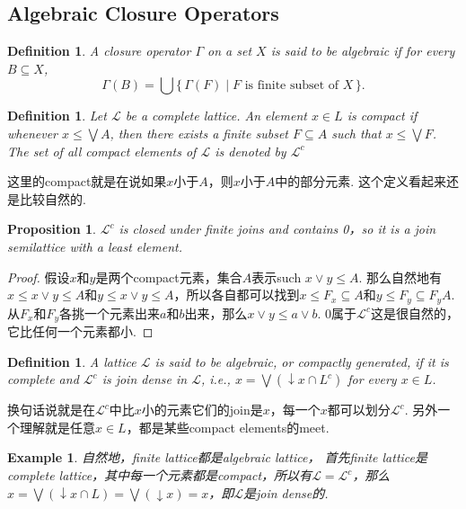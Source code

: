\documentclass{article}
\newtheorem{proposition}[theorem]{Proposition}
\newtheorem{example}[theorem]{Example}
\newtheorem{definition}[theorem]{Definition}
\newcommand\Set[2]{\{\,#1\mid#2\,\}} %
\newcommand\SET[2]{\Set{#1}{\text{#2}}} %
\newcommand\lattice{\mathcal{L}}
\begin{document}
\subsection{Algebraic Closure Operators}

\begin{definition}
\rm A {\color{red} closure operator} $\Gamma$ on a set $X$ is said to be {\color{red} algebraic} if for every $B \subseteq X$,
$$
\Gamma(B) = \bigcup \SET{\Gamma(F)}{$F$ is finite subset of $X$}.
$$
\end{definition}

\begin{definition}
\rm Let $\lattice$ be a complete lattice. An element $x \in L$ is {\color{red} compact} if whenever $x \leq \bigvee A$, then there exists a finite subset $F \subseteq A$ such that $x \leq \bigvee F$. The set of all compact elements of $\lattice$ is denoted by $\lattice^c$
\end{definition}

{\color{blue} 这里的compact就是在说如果$x$小于$A$，则$x$小于$A$中的部分元素. 这个定义看起来还是比较自然的}.

\begin{proposition}
\rm $\lattice^c$ is closed under finite joins and contains 0，so it is a join semilattice with a least element.
\end{proposition}

\begin{proof}
假设$x$和$y$是两个compact元素，集合$A$表示such $x \vee y \leq A$. 那么自然地有$x \leq x \vee y \leq A $和$y \leq x \vee y \leq A$，所以各自都可以找到$x \leq F_x \subseteq A$和$y \leq F_y \subseteq F_y A$. 从$F_x$和$F_y$各挑一个元素出来$a$和$b$出来，那么$x\vee y \leq a\vee b$. 0属于$\lattice^c$这是很自然的，它比任何一个元素都小.
\end{proof}

\begin{definition}
\rm A lattice $\lattice$ is said to be {\color{red} algebraic, or compactly generated}, if it is complete and $\lattice^c$ is join dense in $\lattice$, i.e., $x = \bigvee (\downarrow x \cap L^c)$ for every $x \in L$.
\end{definition}

{\color{blue} 换句话说就是在$\lattice^c$中比$x$小的元素它们的join是$x$，每一个$x$都可以划分$\lattice^c$. 另外一个理解就是任意$x \in L$，都是某些compact elements的meet}.

\begin{example}
\rm 自然地，finite lattice都是algebraic lattice， 首先finite lattice是complete lattice，其中每一个元素都是compact，所以有$\lattice = \lattice ^c$，那么$x = \bigvee (\downarrow x \cap L) = \bigvee (\downarrow x) = x$，即$\lattice$是join dense的. 
\end{example} 
\end{document}
